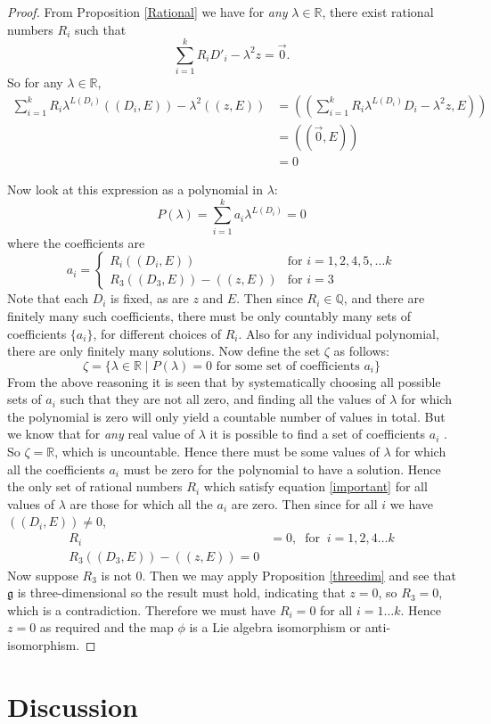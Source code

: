 \documentclass[honours]{UNSWthesis}
\newcommand{\R}{\mathbb{R}}
\newcommand{\Q}{\mathbb{Q}}
\newcommand{\g}{\mathfrak{g}}
\newcommand{\1}{\mathbf{e}_{1}}
\newcommand{\2}{\mathbf{e}_{3}}
\newcommand{\3}{\mathbf{e}_{3}}
\begin{document}
\begin{proof}
From Proposition \ref{Rational} we have for \emph{any} $\lambda \in \R$, there exist rational numbers $R_{i}$ such that
\begin{equation}\label{important}
 \sum\limits_{i=1}^{k}R_{i}D'_{i} -\lambda^{2} z  = \vec{0}.
\end{equation}
So for any $\lambda \in \R$,
\begin{align*}
\sum\limits_{i=1}^{k}R_{i}\lambda^{L(D_{i})}(( D_{i}, E))-\lambda^{2}((z,E))
&= (( \sum\limits_{i=1}^{k}R_{i}\lambda^{L(D_{i})}D_{i}-\lambda^{2}z,E)) \\
&=((\vec{0}, E))\\
&=0
\end{align*}

Now look at this expression as a polynomial in $\lambda$:
\[
P(\lambda)=\sum\limits_{i=1}^{k} a_{i}\lambda^{L(D_{i})}=0
\]
where the coefficients are 
\[
a_{i}= 
\left\lbrace
\begin{array}{ll}
R_{i}((D_{i},E)) & \text{for $i=1,2,4,5,\ldots k$} \\
R_{3}((D_{3},E))-((z,E)) & \text{for $i=3$}
\end{array}
\right.
\]
Note that each $D_{i}$ is fixed, as are $z$ and $E$. Then since $R_{i} \in \Q$, and there are finitely many such coefficients, there must be only countably many sets of coefficients $\{a_{i} \}$, for different choices of $R_{i}$. Also for any individual polynomial, there are only finitely many solutions.
Now define the set $\zeta$ as follows:
\[
\zeta = \{ \lambda \in \R \mid P(\lambda)=0 \text{ for some set of coefficients $a_{i}$} \}
\]
From the above reasoning it is seen that by systematically choosing all possible sets of $a_{i}$ such that they are not all zero, and finding all the values of $\lambda$ for which the polynomial is zero will only yield a countable number of values in total. But we know that for \emph{any} real value of $\lambda$ it is possible to find a set of coefficients $a_{i}$ . So $\zeta=\R$, which is uncountable. Hence there must be some values of $\lambda$ for which all the coefficients $a_{i}$ must be zero for the polynomial to have a solution. Hence the only set of rational numbers $R_{i}$ which satisfy equation \ref{important} for all values of $\lambda$ are those for which all the $a_{i}$ are zero. Then since for all $i$ we have $((D_{i},E)) \neq 0$,
\begin{align*}
R_{i}&=0, \;\;\text{for}\;\;i=1,2,4\ldots k \\
R_{3}((D_{3},E))-((z,E))=0
\end{align*}
Now suppose $R_{3}$ is not $0$. Then we may apply Proposition \ref{threedim} and see that $\g$ is three-dimensional so the result must hold, indicating that $z=0$, so $R_{3}=0$, which is a contradiction. \newline
Therefore we must have $R_{i}=0$ for all $i=1 \ldots k $. Hence $z=0$ as required and the map $\phi$ is a Lie algebra isomorphism or anti-isomorphism.

\end{proof}

\chapter{Discussion}


\end{document}
